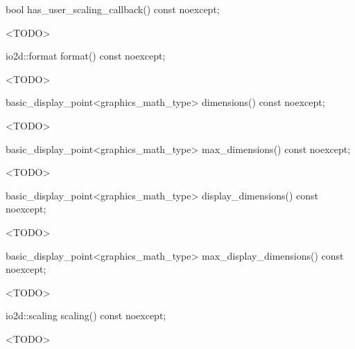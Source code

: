 %
\begin{itemdecl}
bool has_user_scaling_callback() const noexcept;
\end{itemdecl}
\begin{itemdescr}
\pnum
\returns
<TODO>
\end{itemdescr}

%
\begin{itemdecl}
io2d::format format() const noexcept;
\end{itemdecl}
\begin{itemdescr}
\pnum
\returns
<TODO>
\end{itemdescr}

%
\begin{itemdecl}
basic_display_point<graphics_math_type> dimensions() const noexcept;
\end{itemdecl}
\begin{itemdescr}
\pnum
\returns
<TODO>
\end{itemdescr}

%
\begin{itemdecl}
basic_display_point<graphics_math_type> max_dimensions() const noexcept;
\end{itemdecl}
\begin{itemdescr}
\pnum
\returns
<TODO>
\end{itemdescr}

%
\begin{itemdecl}
basic_display_point<graphics_math_type> display_dimensions() const noexcept;
\end{itemdecl}
\begin{itemdescr}
\pnum
\returns
<TODO>
\end{itemdescr}

%
\begin{itemdecl}
basic_display_point<graphics_math_type> max_display_dimensions() const noexcept;
\end{itemdecl}
\begin{itemdescr}
\pnum
\returns
<TODO>
\end{itemdescr}

%
\begin{itemdecl}
io2d::scaling scaling() const noexcept;
\end{itemdecl}
\begin{itemdescr}
\pnum
\returns
<TODO>
\end{itemdescr}

